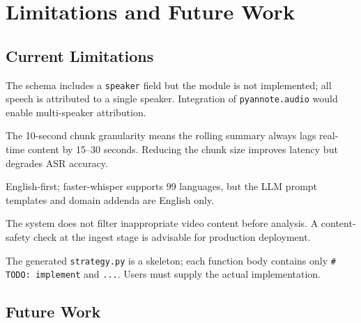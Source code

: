 \documentclass[12pt,a4paper]{article}
\begin{document}
\section{Limitations and Future Work}
\label{sec:limitations}

\subsection{Current Limitations}

\begin{description}[leftmargin=1.5cm]
  \item[Speaker diarisation.] The schema includes a \texttt{speaker} field but the
    module is not implemented; all speech is attributed to a single speaker.
    Integration of \texttt{pyannote.audio} would enable multi-speaker attribution.
  \item[Live latency.] The 10-second chunk granularity means the rolling summary always
    lags real-time content by 15--30 seconds. Reducing the chunk size improves latency
    but degrades ASR accuracy.
  \item[Language.] English-first; faster-whisper supports 99 languages, but the LLM
    prompt templates and domain addenda are English only.
  \item[Moderation.] The system does not filter inappropriate video content before
    analysis. A content-safety check at the ingest stage is advisable for production
    deployment.
  \item[Strategy execution.] The generated \texttt{strategy.py} is a skeleton; each
    function body contains only \texttt{\# TODO: implement} and \texttt{...}. Users
    must supply the actual implementation.
\end{description}

\subsection{Future Work}
\end{document}

